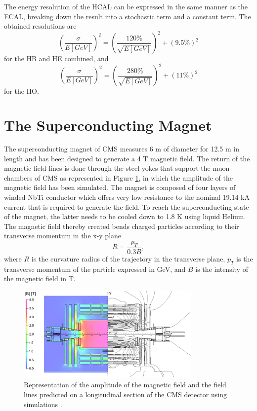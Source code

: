     The energy resolution of the HCAL can be expressed in the same manner as the ECAL, breaking down the result into a stochastic term and a constant term. The obtained resolutions \cite{Baiatian:1049929} are
    \begin{equation}
      \left( \frac{\sigma}{E[GeV]} \right)^2 = \left( \frac{120\%}{\sqrt{E[GeV]}} \right)^2 + (9.5\%)^2
    \end{equation}
    for the HB and HE combined, and
    \begin{equation}
      \left( \frac{\sigma}{E[GeV]} \right)^2 = \left( \frac{280\%}{\sqrt{E[GeV]}} \right)^2 + (11\%)^2
    \end{equation}
    for the HO.

  \section{The Superconducting Magnet}

    The superconducting magnet of CMS measures 6 m of diameter for 12.5 m in length and has been designed to generate a 4 T magnetic field. The return of the magnetic field lines is done through the steel yokes that support the muon chambers of CMS as represented in Figure \ref{fig:I-3-cms-magnet}, in which the amplitude of the magnetic field has been simulated. The magnet is composed of four layers of winded NbTi conductor which offers very low resistance to the nominal 19.14 kA current that is required to generate the field. To reach the superconducting state of the magnet, the latter needs to be cooled down to 1.8 K using liquid Helium. The magnetic field thereby created bends charged particles according to their transverse momentum in the x-y plane
    \begin{equation}
      R = \frac{p_T}{0.3 B} ,
    \end{equation}
    where $ R $ is the curvature radius of the trajectory in the transverse plane, $ p_T $ is the transverse momentum of the particle expressed in GeV, and $ B $ is the intensity of the magnetic field in T.

    \begin{figure}[h!]
      \centering
      \includegraphics[width=0.8\textwidth]{img/I-3-cms/magnet.png}
      \caption{Representation of the amplitude of the magnetic field and the field lines predicted on a longitudinal section of the CMS detector using simulations \cite{Chatrchyan:2009si}.}
      \label{fig:I-3-cms-magnet}
    \end{figure}

